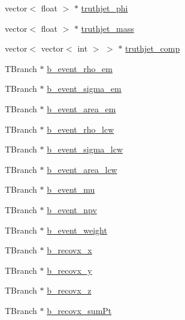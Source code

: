 \begin{DoxyCompactItemize}
vector$<$ float $>$ $\ast$ \hyperlink{classJetAnalysisExample_a34a1e4145be72221b9f084a4ea76088d}{truthjet\+\_\+phi}
\item 
vector$<$ float $>$ $\ast$ \hyperlink{classJetAnalysisExample_a13826e5304d10b5be0567d93f737a065}{truthjet\+\_\+mass}
\item 
vector$<$ vector$<$ int $>$ $>$ $\ast$ \hyperlink{classJetAnalysisExample_a038d5b157d4d22025600137efc30346f}{truthjet\+\_\+comp}
\item 
T\+Branch $\ast$ \hyperlink{classJetAnalysisExample_a019655141606a5c4a0d605dadb0fc574}{b\+\_\+event\+\_\+rho\+\_\+em}
\item 
T\+Branch $\ast$ \hyperlink{classJetAnalysisExample_aef74393e87ef97c6cbbb6472c5b50f17}{b\+\_\+event\+\_\+sigma\+\_\+em}
\item 
T\+Branch $\ast$ \hyperlink{classJetAnalysisExample_aed330ac0c8d9a6e7c74131c052a218c7}{b\+\_\+event\+\_\+area\+\_\+em}
\item 
T\+Branch $\ast$ \hyperlink{classJetAnalysisExample_aadabe6c13cd2bc337b8339104b37b391}{b\+\_\+event\+\_\+rho\+\_\+lcw}
\item 
T\+Branch $\ast$ \hyperlink{classJetAnalysisExample_a305d99c9e84549293ba749477bfc0741}{b\+\_\+event\+\_\+sigma\+\_\+lcw}
\item 
T\+Branch $\ast$ \hyperlink{classJetAnalysisExample_a8d908a79779a480a04c0e270fbec5360}{b\+\_\+event\+\_\+area\+\_\+lcw}
\item 
T\+Branch $\ast$ \hyperlink{classJetAnalysisExample_a102fe8511f0e7eda1a04dad72ff5235b}{b\+\_\+event\+\_\+mu}
\item 
T\+Branch $\ast$ \hyperlink{classJetAnalysisExample_ae7823beaf922a64c3044c9e17385db16}{b\+\_\+event\+\_\+npv}
\item 
T\+Branch $\ast$ \hyperlink{classJetAnalysisExample_a8554681f828884f17895e114f83891c4}{b\+\_\+event\+\_\+weight}
\item 
T\+Branch $\ast$ \hyperlink{classJetAnalysisExample_aa2c01dcc559c40b91fd89c142e6456bb}{b\+\_\+recovx\+\_\+x}
\item 
T\+Branch $\ast$ \hyperlink{classJetAnalysisExample_a24c1808a940115a36be4cdf9185366de}{b\+\_\+recovx\+\_\+y}
\item 
T\+Branch $\ast$ \hyperlink{classJetAnalysisExample_a348934c7a87f14c75bb463979948cf21}{b\+\_\+recovx\+\_\+z}
\item 
T\+Branch $\ast$ \hyperlink{classJetAnalysisExample_a557adefcccaaf5688344aaee7b87c798}{b\+\_\+recovx\+\_\+sum\+Pt}
\item 

\end{DoxyCompactItemize}

